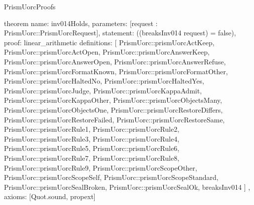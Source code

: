 \begin{lexlean}{PrismUorcProofs}
\begin{semanticmodule}
theorem{
  name: inv014Holds,
  parameters: [request : PrismUorc::PrismUorcRequest],
  statement: ((breaksInv014 request) = false),
  proof: linear_arithmetic{
    definitions: [
      PrismUorc::prismUorcActKeep,
      PrismUorc::prismUorcActOpen,
      PrismUorc::prismUorcAnswerKeep,
      PrismUorc::prismUorcAnswerOpen,
      PrismUorc::prismUorcAnswerRefuse,
      PrismUorc::prismUorcFormatKnown,
      PrismUorc::prismUorcFormatOther,
      PrismUorc::prismUorcHaltedNo,
      PrismUorc::prismUorcHaltedYes,
      PrismUorc::prismUorcJudge,
      PrismUorc::prismUorcKappaAdmit,
      PrismUorc::prismUorcKappaOther,
      PrismUorc::prismUorcObjectsMany,
      PrismUorc::prismUorcObjectsOne,
      PrismUorc::prismUorcRestoreDiffers,
      PrismUorc::prismUorcRestoreFailed,
      PrismUorc::prismUorcRestoreSame,
      PrismUorc::prismUorcRule1,
      PrismUorc::prismUorcRule2,
      PrismUorc::prismUorcRule3,
      PrismUorc::prismUorcRule4,
      PrismUorc::prismUorcRule5,
      PrismUorc::prismUorcRule6,
      PrismUorc::prismUorcRule7,
      PrismUorc::prismUorcRule8,
      PrismUorc::prismUorcRule9,
      PrismUorc::prismUorcScopeOther,
      PrismUorc::prismUorcScopeSelf,
      PrismUorc::prismUorcScopeStandard,
      PrismUorc::prismUorcSealBroken,
      PrismUorc::prismUorcSealOk,
      breaksInv014
    ]
  },
  axioms: [Quot.sound, propext]
}
\end{semanticmodule}
\end{lexlean}
